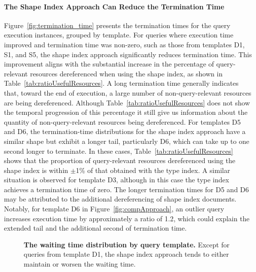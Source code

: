 \paragraph{The Shape Index Approach Can Reduce the Termination Time}
Figure~\ref{fig:termination_time} presents the termination times for the query execution instances, grouped by template.
For queries where execution time improved and termination time was non-zero, such as those from templates D1, S1, and S5, the shape index approach significantly reduces termination time.
This improvement aligns with the substantial increase in the percentage of query-relevant resources dereferenced when using the shape index, as shown in Table~\ref{tab:ratioUsefulResources}.
A long termination time generally indicates that, toward the end of execution, a large number of non-query-relevant resources are being dereferenced.
Although Table~\ref{tab:ratioUsefulResources} does not show the temporal progression of this percentage it still give us information about the quantity of non-query-relevant resources being dereferenced.
For templates D5 and D6, the termination-time distributions for the shape index approach have a similar shape but exhibit a longer tail, particularly D6, which can take up to one second longer to terminate.
In these cases, Table~\ref{tab:ratioUsefulResources} shows that the proportion of query-relevant resources dereferenced using the shape index is within $\pm$1\% of that obtained with the type index.
A similar situation is observed for template D3, although in this case the type index achieves a termination time of zero.
The longer termination times for D5 and D6 may be attributed to the additional dereferencing of shape index documents.
Notably, for template D6 in Figure~\ref{fig:compApproach}, an outlier query increases execution time by approximately a ratio of 1.2, which could explain the extended tail and the additional second of termination time.


\begin{figure}
	\centering
	\def\svgwidth{\linewidth}
	
	\caption{
		\textbf{The waiting time distribution by query template.}
		Except for queries from template D1, the shape index approach tends to either maintain or worsen the waiting time.}
	\label{fig:waiting_time}
\end{figure}

